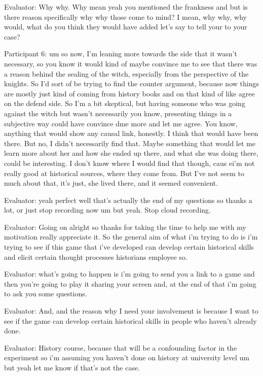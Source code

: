\documentclass{l4proj}
\begin{document}
\begin{appendices}
Evaluator: Why why. Why mean yeah you mentioned the frankness and but is there reason specifically why why those come to mind? I mean, why why, why would, what do you think they would have added let's say to tell your to your case?

Participant 6: um so now, I’m leaning more towards the side that it wasn't necessary, so you know it would kind of maybe convince me to see that there was a reason behind the sealing of the witch, especially from the perspective of the knights. So I’d sort of be trying to find the counter argument, because now things are mostly just kind of coming from history books and on that kind of like agree on the defend side. So I’m a bit skeptical, but having someone who was going against the witch but wasn’t necessarily you know, presenting things in a subjective way could have convince dme more and let me agree. You know, anything that would show any causal link, honestly. I think that would have been there. But no, I didn’t necessarily find that. Maybe something that would let me learn more about her and how she ended up there, and what she was doing there, could be interesting. I don’t know where I would find that though, caus ei’m not really good at historical sources, where they come from. But I’ve not seem to much about that, it’s just, she lived there, and it seemed convenient. 

Evaluator: yeah perfect well that's actually the end of my questions so thanks a lot, or just stop recording now um but yeah. Stop cloud recording. 

Evaluator: Going on alright so thanks for taking the time to help me with my motivation really appreciate it. So the general aim of what i'm trying to do is i'm trying to see if this game that i've developed can develop certain historical skills and elicit certain thought processes historians employee so.

Evaluator: what's going to happen is i'm going to send you a link to a game and then you're going to play it sharing your screen and, at the end of that i'm going to ask you some questions.

Evaluator: And, and the reason why I need your involvement is because I want to see if the game can develop certain historical skills in people who haven't already done.

Evaluator: History course, because that will be a confounding factor in the experiment so i'm assuming you haven't done on history at university level um but yeah let me know if that's not the case.


\end{appendices}
\end{document}
